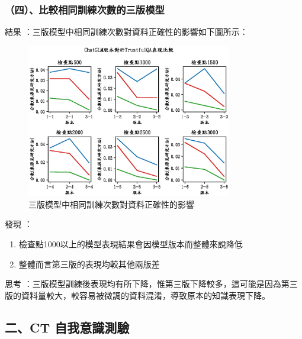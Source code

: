 \documentclass[12pt,a4paper,MingLiU,UTF8,natbib]{article}
\def\xeCJKembold{0.4}
\def\saveCJKnode{\dimen255\lastkern}
\def\restoreCJKnode{\kern-\dimen255\kern\dimen255}
\let\CJKoldsymbol\CJKsymbol
\let\CJKoldpunctsymbol\CJKpunctsymbol
\def\CJKfakeboldsymbol#1{%
	\special{pdf:literal direct 2 Tr \xeCJKembold\space w}%
	\CJKoldsymbol{#1}%
	\saveCJKnode
	\special{pdf:literal direct 0 Tr}%
	\restoreCJKnode}
\def\CJKfakeboldpunctsymbol#1{%
	\special{pdf:literal direct 2 Tr \xeCJKembold\space w}%
	\CJKoldpunctsymbol{#1}%
	\saveCJKnode
	\special{pdf:literal direct 0 Tr}%
	\restoreCJKnode}
\newcommand\CJKfakebold[1]{%
	\let\CJKsymbol\CJKfakeboldsymbol
	\let\CJKpunctsymbol\CJKfakeboldpunctsymbol
	#1%
	\let\CJKsymbol\CJKoldsymbol
	\let\CJKpunctsymbol\CJKoldpunctsymbol}
\begin{document}
\parbox{\textwidth}{

	\subsubsection{（四）、比較相同訓練次數的三版模型}
	
	\CJKfakebold{結果}：三版模型中相同訓練次數對資料正確性的影響如下圖所示：
	
		\begin{figure}[H]
		\centering
		\includegraphics[width=0.8\textwidth]{allcomp}
		\caption{三版模型中相同訓練次數對資料正確性的影響}
	\end{figure}
	
	\CJKfakebold{發現}：
	
	

	\begin{enumerate}
		\item 檢查點1000以上的模型表現結果會因模型版本而整體來說降低
		\item 整體而言第三版的表現均較其他兩版差
	\end{enumerate}



	\CJKfakebold{思考}：三版模型訓練後表現均有所下降，惟第三版下降較多，這可能是因為第三版的資料量較大，較容易被微調的資料混淆，導致原本的知識表現下降。
	
}

	\subsection{二、CT 自我意識測驗}
	
\end{document}
